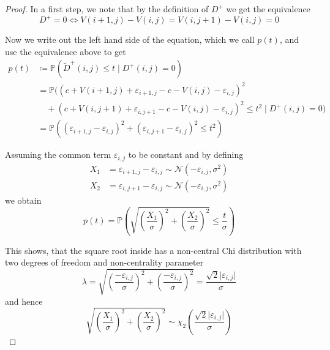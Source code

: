 \documentclass[a4paper,12pt]{article}
\newcommand{\abs}[1]{\lvert#1\rvert}
\theoremstyle{plain}
\theoremstyle{definition}
\theoremstyle{remark}
\begin{document}
\begin{proof}
	In a first step, we note that by the definition of $D^+$ we get the equivalence
	\begin{equation*}
		D^+ = 0 \Leftrightarrow V(i + 1, j) - V(i, j) = V(i, j + 1) - V(i, j) = 0
	\end{equation*}
	
	Now we write out the left hand side of the equation, which we call $p(t)$, and use the equivalence above to get
	\begin{align*}
		p(t) &\coloneqq \mathbb{P}(\tilde{D}^+(i, j) \leq t \mid D^+(i, j) = 0) \\
		&= \mathbb{P}\big( (c + V(i + 1, j) + \varepsilon_{i + 1, j} - c - V(i, j) - \varepsilon_{i, j})^2 \\
		&\quad + (c + V(i, j + 1) + \varepsilon_{i, j + 1} - c - V(i, j) - \varepsilon_{i, j})^2 \leq t^2 \mid D^+(i, j) = 0 \big) \\
		&= \mathbb{P}\left( (\varepsilon_{i + 1, j} - \varepsilon_{i, j})^2 + (\varepsilon_{i, j + 1} - \varepsilon_{i, j})^2 \leq t^2 \right)
	\end{align*}
	
	Assuming the common term $\varepsilon_{i, j}$ to be constant and by defining
	\begin{align*}
		X_1 &= \varepsilon_{i + 1, j} - \varepsilon_{i, j} \sim \mathcal{N}(- \varepsilon_{i, j}, \sigma^2) \\
		X_2 &= \varepsilon_{i, j + 1} - \varepsilon_{i, j} \sim \mathcal{N}(- \varepsilon_{i, j}, \sigma^2)
	\end{align*}
	we obtain
	\begin{equation*}
		p(t) = \mathbb{P}\left( \sqrt{\left( \frac{X_1}{\sigma} \right)^2 + \left( \frac{X_2}{\sigma} \right)^2} \leq \frac{t}{\sigma} \right)
	\end{equation*}
	
	This shows, that the square root inside has a non-central Chi distribution with two degrees of freedom and non-centrality parameter
	\begin{equation*}
		\lambda = \sqrt{\left( \frac{- \varepsilon_{i, j}}{\sigma} \right)^2 + \left( \frac{- \varepsilon_{i, j}}{\sigma} \right)^2} = \frac{\sqrt{2} \abs{\varepsilon_{i, j}}}{\sigma}
	\end{equation*}
	and hence
	\begin{equation*}
		\sqrt{\left( \frac{X_1}{\sigma} \right)^2 + \left( \frac{X_2}{\sigma} \right)^2} \sim \chi_2 \left( \frac{\sqrt{2} \abs{\varepsilon_{i, j}}}{\sigma} \right)
	\end{equation*}
	

\end{proof}
\end{document}
